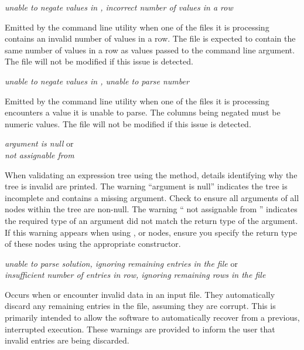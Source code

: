 \noindent
\textit{unable to negate values in , incorrect number of values in a row}
\begin{indented}
  Emitted by the  command line utility when one of the files it is processing contains an invalid number of values in a row.  The file is expected to contain the same number of values in a row as values passed to the  command line argument.  The file will not be modified if this issue is detected.
\end{indented}

\noindent
\textit{unable to negate values in , unable to parse number}
\begin{indented}
  Emitted by the  command line utility when one of the files it is processing encounters a value it is unable to parse.  The columns being negated must be numeric values.  The file will not be modified if this issue is detected.
\end{indented}

\noindent
\textit{argument is null} or\\
\textit{ not assignable from }
\begin{indented}
  When validating an expression tree using the  method, details identifying why the tree is invalid are printed.  The warning ``argument is null'' indicates the tree is incomplete and contains a missing argument. Check to ensure all arguments of all nodes within the tree are non-null. The warning `` not assignable from '' indicates the required type of an argument did not match the return type of the argument.  If this warning appears when using ,  or  nodes, ensure you specify the return type of these nodes using the appropriate constructor.
\end{indented}

\noindent
\textit{unable to parse solution, ignoring remaining entries in the file} or\\
\textit{insufficient number of entries in row, ignoring remaining rows in the file}
\begin{indented}
  Occurs when  or  encounter invalid data in an input file.  They automatically discard any remaining entries in the file, assuming they are corrupt.  This is primarily intended to allow the software to automatically recover from a previous, interrupted execution. These warnings are provided to inform the user that invalid entries are being discarded.
\end{indented}